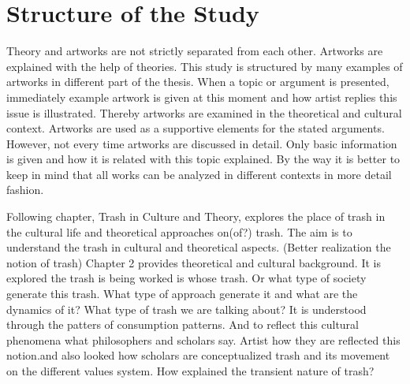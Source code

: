  





%
\section{Structure of the Study}
Theory and artworks are not strictly separated from each other. Artworks are explained with the help of theories. This study is structured by many examples of artworks in different part of the thesis. When a topic or argument is presented, immediately example artwork is given at this moment and how artist replies this issue is illustrated. Thereby artworks are examined in the theoretical and cultural context. Artworks are used as a supportive elements for the stated arguments.  However, not every time artworks are discussed in detail. Only basic information is given and how it is related with this topic explained. By the way it is better to keep in mind that all works can be analyzed in different contexts in more detail fashion.


Following chapter, Trash in Culture and Theory, explores the place of trash in the cultural life and theoretical approaches on(of?) trash. The aim is to understand the trash in cultural and theoretical aspects. (Better realization the notion of trash) Chapter 2 provides theoretical and cultural background. It is explored the trash is being worked is whose trash. Or what type of society generate this trash. What type of approach generate it and what are the dynamics of it? What type of trash we are talking about? It is understood through the patters of consumption patterns. And to reflect this cultural phenomena what philosophers and scholars say. Artist how they are reflected this notion.and also looked how scholars are conceptualized trash and its movement on the different values system. How explained the transient nature of trash?

